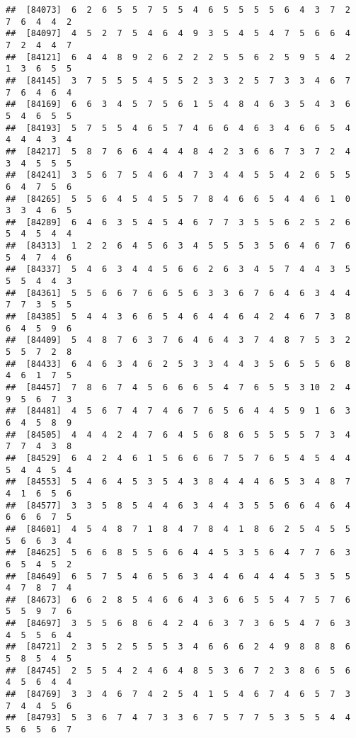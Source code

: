\documentclass[
]{book}
\begin{document}
\begin{verbatim}
##  [84073]  6  2  6  5  5  7  5  5  4  6  5  5  5  5  6  4  3  7  2  7  6  4  4  2
##  [84097]  4  5  2  7  5  4  6  4  9  3  5  4  5  4  7  5  6  6  4  7  2  4  4  7
##  [84121]  6  4  4  8  9  2  6  2  2  2  5  5  6  2  5  9  5  4  2  1  3  6  5  5
##  [84145]  3  7  5  5  5  4  5  5  2  3  3  2  5  7  3  3  4  6  7  7  6  4  6  4
##  [84169]  6  6  3  4  5  7  5  6  1  5  4  8  4  6  3  5  4  3  6  5  4  6  5  5
##  [84193]  5  7  5  5  4  6  5  7  4  6  6  4  6  3  4  6  6  5  4  4  4  4  3  4
##  [84217]  5  8  7  6  6  4  4  4  8  4  2  3  6  6  7  3  7  2  4  3  4  5  5  5
##  [84241]  3  5  6  7  5  4  6  4  7  3  4  4  5  5  4  2  6  5  5  6  4  7  5  6
##  [84265]  5  5  6  4  5  4  5  5  7  8  4  6  6  5  4  4  6  1  0  3  3  4  6  5
##  [84289]  6  4  6  3  5  4  5  4  6  7  7  3  5  5  6  2  5  2  6  5  4  5  4  4
##  [84313]  1  2  2  6  4  5  6  3  4  5  5  5  3  5  6  4  6  7  6  5  4  7  4  6
##  [84337]  5  4  6  3  4  4  5  6  6  2  6  3  4  5  7  4  4  3  5  5  5  4  4  3
##  [84361]  5  5  6  6  7  6  6  5  6  3  3  6  7  6  4  6  3  4  4  7  7  3  5  5
##  [84385]  5  4  4  3  6  6  5  4  6  4  4  6  4  2  4  6  7  3  8  6  4  5  9  6
##  [84409]  5  4  8  7  6  3  7  6  4  6  4  3  7  4  8  7  5  3  2  5  5  7  2  8
##  [84433]  6  4  6  3  4  6  2  5  3  3  4  4  3  5  6  5  5  6  8  4  6  1  7  5
##  [84457]  7  8  6  7  4  5  6  6  6  5  4  7  6  5  5  3 10  2  4  9  5  6  7  3
##  [84481]  4  5  6  7  4  7  4  6  7  6  5  6  4  4  5  9  1  6  3  6  4  5  8  9
##  [84505]  4  4  4  2  4  7  6  4  5  6  8  6  5  5  5  5  7  3  4  7  7  4  3  8
##  [84529]  6  4  2  4  6  1  5  6  6  6  7  5  7  6  5  4  5  4  4  5  4  4  5  4
##  [84553]  5  4  6  4  5  3  5  4  3  8  4  4  4  6  5  3  4  8  7  4  1  6  5  6
##  [84577]  3  3  5  8  5  4  4  6  3  4  4  3  5  5  6  6  4  6  4  6  6  6  7  5
##  [84601]  4  5  4  8  7  1  8  4  7  8  4  1  8  6  2  5  4  5  5  5  6  6  3  4
##  [84625]  5  6  6  8  5  5  6  6  4  4  5  3  5  6  4  7  7  6  3  6  5  4  5  2
##  [84649]  6  5  7  5  4  6  5  6  3  4  4  6  4  4  4  5  3  5  5  4  7  8  7  4
##  [84673]  6  6  2  8  5  4  6  6  4  3  6  6  5  5  4  7  5  7  6  5  5  9  7  6
##  [84697]  3  5  5  6  8  6  4  2  4  6  3  7  3  6  5  4  7  6  3  4  5  5  6  4
##  [84721]  2  3  5  2  5  5  5  3  4  6  6  6  2  4  9  8  8  8  6  5  8  5  4  5
##  [84745]  2  5  5  4  2  4  6  4  8  5  3  6  7  2  3  8  6  5  6  4  5  6  4  4
##  [84769]  3  3  4  6  7  4  2  5  4  1  5  4  6  7  4  6  5  7  3  7  4  4  5  6
##  [84793]  5  3  6  7  4  7  3  3  6  7  5  7  7  5  3  5  5  4  4  5  6  5  6  7

\end{verbatim}
\end{document}
